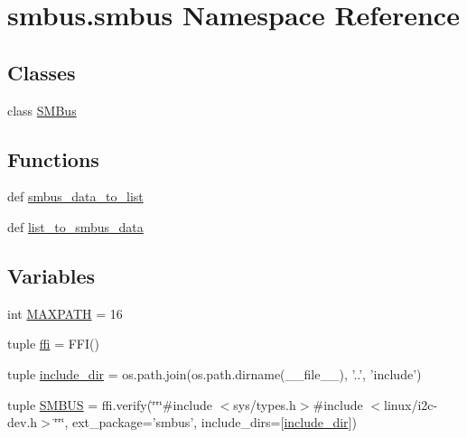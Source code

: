 \hypertarget{namespacesmbus_1_1smbus}{}\section{smbus.\+smbus Namespace Reference}
\label{namespacesmbus_1_1smbus}
\subsection*{Classes}
\begin{DoxyCompactItemize}
\item 
class \hyperlink{classsmbus_1_1smbus_1_1SMBus}{S\+M\+Bus}
\end{DoxyCompactItemize}
\subsection*{Functions}
\begin{DoxyCompactItemize}
\item 
def \hyperlink{namespacesmbus_1_1smbus_a05e1c39fc75b1f9c1428e9acfa8f2dfd}{smbus\+\_\+data\+\_\+to\+\_\+list}
\item 
def \hyperlink{namespacesmbus_1_1smbus_ad4dffb22ddd28a8609d08918fb845a46}{list\+\_\+to\+\_\+smbus\+\_\+data}
\end{DoxyCompactItemize}
\subsection*{Variables}
\begin{DoxyCompactItemize}
\item 
int \hyperlink{namespacesmbus_1_1smbus_a7808549bfcca2a6d1a479b6005e5bc58}{M\+A\+X\+P\+A\+T\+H} = 16
\item 
tuple \hyperlink{namespacesmbus_1_1smbus_a5424692b7666a19a649c29b48a2cb80b}{ffi} = F\+F\+I()
\item 
tuple \hyperlink{namespacesmbus_1_1smbus_a6d081d56f12318506ac9dacee17e9bc3}{include\+\_\+dir} = os.\+path.\+join(os.\+path.\+dirname(\+\_\+\+\_\+file\+\_\+\+\_\+), '..', 'include')
\item 
tuple \hyperlink{namespacesmbus_1_1smbus_a12e727c180b256eccd92b0dba41c9654}{S\+M\+B\+U\+S} = ffi.\+verify(\char`\"{}\char`\"{}\char`\"{}\#include $<$sys/types.\+h$>$\#include $<$linux/i2c-\/dev.\+h$>$\char`\"{}\char`\"{}\char`\"{}, ext\+\_\+package='smbus', include\+\_\+dirs=\mbox{[}\hyperlink{namespacesmbus_1_1smbus_a6d081d56f12318506ac9dacee17e9bc3}{include\+\_\+dir}\mbox{]})
\end{DoxyCompactItemize}


